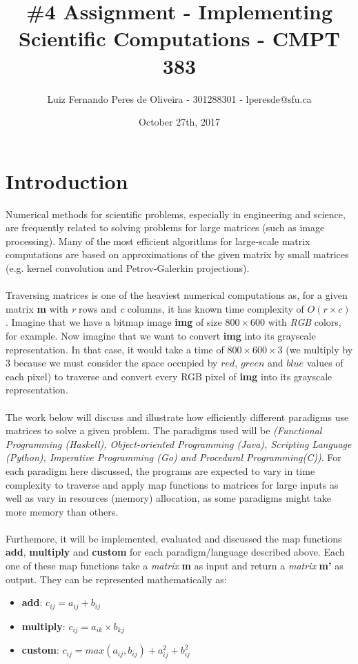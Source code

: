 \documentclass[conference]{IEEEtran}
\title{\#4 Assignment - Implementing Scientific Computations - CMPT 383}
\author{Luiz Fernando Peres de Oliveira - 301288301 - lperesde@sfu.ca}
\date{October 27th, 2017}
\begin{document}
\maketitle
\section{Introduction}
Numerical methods for scientific problems, especially in engineering and science, are frequently related to solving problems for large matrices (such as image processing). Many of the most efficient algorithms for large-scale matrix computations are based on approximations of the given matrix by small matrices (e.g. kernel convolution and Petrov-Galerkin projections).
\\\\
Traversing matrices is one of the heaviest numerical computations as, for a given matrix \textbf{m} with \textit{r} rows and \textit{c} columns, it has known time complexity of $O(r\times c)$. Imagine that we have a bitmap image \textbf{img} of size $800 \times 600$ with \textit{RGB} colors, for example. Now imagine that we want to convert \textbf{img} into its grayscale representation.  In that case, it would take a time of $800 \times 600 \times 3$ (we multiply by 3 because we must consider the space occupied by $red$, $green$ and $blue$ values of each pixel) to traverse and convert every RGB pixel of \textbf{img} into its grayscale representation.
\\\\
The work below will discuss and illustrate how efficiently different paradigms use matrices to solve a given problem. The paradigms used will be \textit{(Functional Programming (Haskell), Object-oriented Programming (Java), Scripting Language (Python), Imperative Programming (Go) and Procedural Programming(C))}. For each paradigm here discussed, the programs are expected to vary in time complexity to traverse and apply map functions to matrices for large inputs as well as vary in resources (memory) allocation, as some paradigms might take more memory than others.
\\\\
Furthemore, it will be implemented, evaluated and discussed the map functions \textbf{add}, \textbf{multiply} and \textbf{custom} for each paradigm/language described above. Each one of these map functions take a \textit{matrix} \textbf{m} as input and return a \textit{matrix} \textbf{m'} as output. They can be represented mathematically as:

\begin{itemize}
	\item \textbf{add}: $c_{ij} = a_{ij} + b_{ij}$
	\item \textbf{multiply}: $c_{ij} = a_{ik} \times b_{kj}$
	\item \textbf{custom}: $c_{ij} = max(a_{ij}, b_{ij}) + a_{ij}^2 + b_{ij}^2$
\end{itemize}
\end{document}
